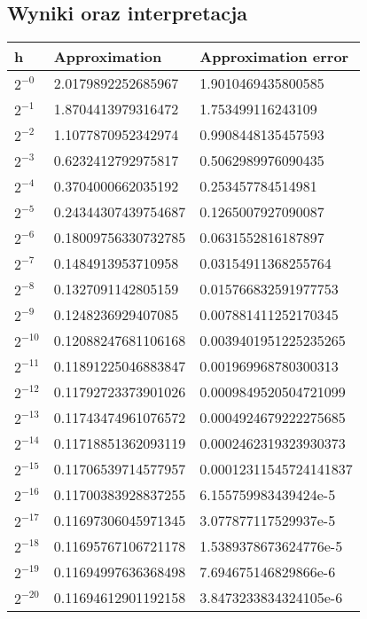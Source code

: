 \documentclass[11pt]{article}
\begin{document}
\subsection{Wyniki oraz interpretacja}
\setlength{\tabcolsep}{2pt}
\renewcommand{\arraystretch}{1.3}
\begin{tabularx}{\textwidth}{|l|X|X|}
\hline
h & Approximation & Approximation error \\
\hline
$2^{-0}$ & 2.0179892252685967 & 1.9010469435800585 \\
\hline
$2^{-1}$ & 1.8704413979316472 & 1.753499116243109 \\
\hline
$2^{-2}$ & 1.1077870952342974 & 0.9908448135457593 \\
\hline
$2^{-3}$ & 0.6232412792975817 & 0.5062989976090435 \\
\hline
$2^{-4}$ & 0.3704000662035192 & 0.253457784514981 \\
\hline
$2^{-5}$ & 0.24344307439754687 & 0.1265007927090087 \\
\hline
$2^{-6}$ & 0.18009756330732785 & 0.0631552816187897 \\
\hline
$2^{-7}$ & 0.1484913953710958 & 0.03154911368255764 \\
\hline
$2^{-8}$ & 0.1327091142805159 & 0.015766832591977753 \\
\hline
$2^{-9}$ & 0.1248236929407085 & 0.007881411252170345 \\
\hline
$2^{-10}$ & 0.12088247681106168 & 0.0039401951225235265 \\
\hline
$2^{-11}$ & 0.11891225046883847 & 0.001969968780300313 \\
\hline
$2^{-12}$ & 0.11792723373901026 & 0.0009849520504721099 \\
\hline
$2^{-13}$ & 0.11743474961076572 & 0.0004924679222275685 \\
\hline
$2^{-14}$ & 0.11718851362093119 & 0.0002462319323930373 \\
\hline
$2^{-15}$ & 0.11706539714577957 & 0.00012311545724141837 \\
\hline
$2^{-16}$ & 0.11700383928837255 & 6.155759983439424e-5 \\
\hline
$2^{-17}$ & 0.11697306045971345 & 3.077877117529937e-5 \\
\hline
$2^{-18}$ & 0.11695767106721178 & 1.5389378673624776e-5 \\
\hline
$2^{-19}$ & 0.11694997636368498 &  7.694675146829866e-6 \\
\hline
$2^{-20}$ & 0.11694612901192158 & 3.8473233834324105e-6 \\

\end{tabularx}
\end{document}
